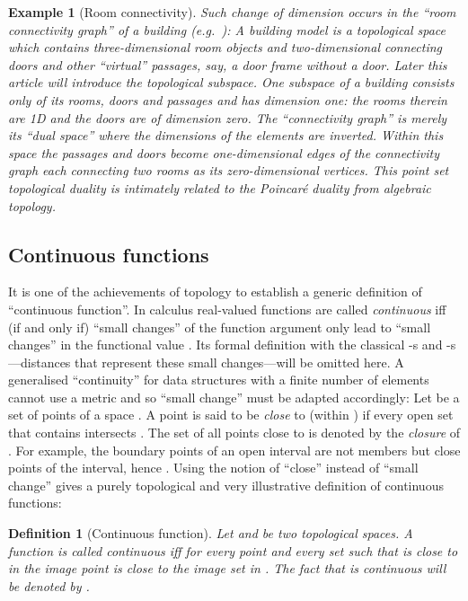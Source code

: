 \documentclass[5p]{elsarticle}
\newtheorem{dfn}{Definition}
\newtheorem{example}{Example}
\newcommand{\qq}[1]{``#1''}
\begin{document}
\begin{sloppy} \begin{example}[Room connectivity]\label{exa:connectivity} 
Such change of dimension occurs in the \qq{room connectivity graph} of a 
building (e.g.\ \cite{Jensen:Indoor}): 
A building model is a topological space which contains 
three-dimensional room objects and two-dimensional connecting doors and other 
\qq{virtual} passages, say, a door frame without a door. 
Later this article will introduce the topological subspace. 
One subspace of a building consists only of its rooms, doors and passages 
and has dimension one: the rooms therein are 1D and the doors are 
of dimension zero. 
The \qq{connectivity graph} is merely its \qq{dual space} where the dimensions 
of the elements are inverted. 
Within this space the passages and doors become one-dimensional edges of the 
connectivity graph each connecting two rooms as its zero-dimensional vertices. 
This \emph{point set} topological duality is intimately related to the Poincar\'e 
duality from \emph{algebraic} topology. 
\end{example}
\end{sloppy} 

\subsection{Continuous functions}
It is one of the achievements of topology to establish a 
ge\-ne\-ric definition of 
\qq{continuous function}. 
In calculus real-valued functions  are called \emph{continuous} 
iff (if and only if) \qq{small changes} of the function argument  only lead to 
\qq{small changes} in the functional value . Its formal definition with the classical 
-s and -s---distances that represent these small changes---will be omitted 
here. 
A generalised \qq{continuity} for data structures with a finite number of 
elements cannot use a metric and so \qq{small change} must be adapted accordingly:
Let  be a set of points of a space . 
A point  is said to be \emph{close} to  (within ) if every open 
set that contains  intersects . 
The set of all points close to  is denoted by  the 
\emph{closure} of . For example, the boundary points of an open interval are not 
members but close points of the interval, hence . 
Using the notion of \qq{close} instead of \qq{small change} gives a purely topological and 
very illustrative definition of continuous functions:

\begin{dfn}[Continuous function]
Let  and  be two 
topological spaces. 
A function  is called \emph{continuous} iff for every point  and every set 
 such that  is close to  in  the image point  is close 
to the image set  in . 
The fact that  is continuous will be denoted by .
\end{dfn}
\end{document}
